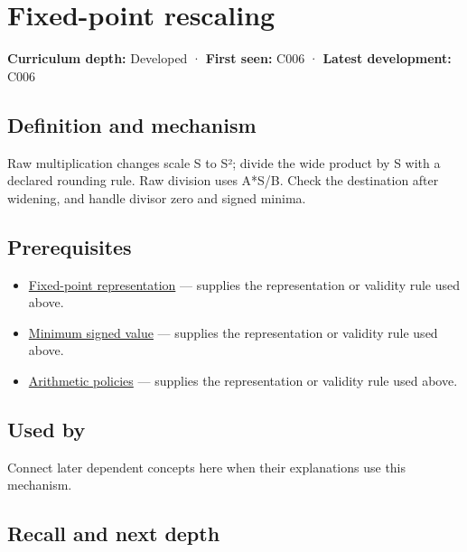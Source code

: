 \hypertarget{appendix-3333db47830f}{}\label{referencestart:appendix-3333db47830f}
\section{Fixed-point rescaling}\label{appendix-3333db47830f-fixed-point-rescaling}

\textbf{Curriculum depth:} Developed · \textbf{First seen:} C006 · \textbf{Latest development:} C006

\begin{allmightroledefinition}

\subsection{Definition and mechanism}\label{appendix-3333db47830f-definition-and-mechanism}

Raw multiplication changes scale S to S²; divide the wide product by S with a declared rounding rule. Raw division uses A*S/B. Check the destination after widening, and handle divisor zero and signed minima.

\end{allmightroledefinition}

\subsection{Prerequisites}\label{appendix-3333db47830f-prerequisites}

\begin{itemize}
\tightlist
\item
  \hyperref[appendix-1d0dbe8924cc]{Fixed-point representation} --- supplies the representation or validity rule used above.
\item
  \hyperref[appendix-05f39b10364d]{Minimum signed value} --- supplies the representation or validity rule used above.
\item
  \hyperref[appendix-2ed044358b82]{Arithmetic policies} --- supplies the representation or validity rule used above.
\end{itemize}

\subsection{Used by}\label{appendix-3333db47830f-used-by}

Connect later dependent concepts here when their explanations use this mechanism.

\subsection{Recall and next depth}\label{appendix-3333db47830f-recall-and-next-depth}

